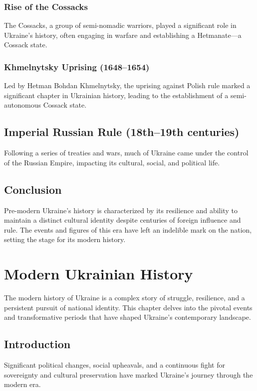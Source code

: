 \documentclass{book}
\begin{document}
\subsection{Rise of the Cossacks}
The Cossacks, a group of semi-nomadic warriors, played a significant role in Ukraine’s history, often engaging in warfare and establishing a Hetmanate—a Cossack state.

\subsection{Khmelnytsky Uprising (1648–1654)}
Led by Hetman Bohdan Khmelnytsky, the uprising against Polish rule marked a significant chapter in Ukrainian history, leading to the establishment of a semi-autonomous Cossack state.

\section{Imperial Russian Rule (18th–19th centuries)}
\label{sec:imperial-russian-rule}
Following a series of treaties and wars, much of Ukraine came under the control of the Russian Empire, impacting its cultural, social, and political life.

\section{Conclusion}
\label{sec:conclusion-pre-modern-ukraine}
Pre-modern Ukraine’s history is characterized by its resilience and ability to maintain a distinct cultural identity despite centuries of foreign influence and rule. The events and figures of this era have left an indelible mark on the nation, setting the stage for its modern history.

\chapter{Modern Ukrainian History}
\label{ch:modern-ukrainian-history}

The modern history of Ukraine is a complex story of struggle, resilience, and a persistent pursuit of national identity. This chapter delves into the pivotal events and transformative periods that have shaped Ukraine's contemporary landscape.

\section{Introduction}
\label{sec:introduction-modern-ukraine}
Significant political changes, social upheavals, and a continuous fight for sovereignty and cultural preservation have marked Ukraine's journey through the modern era.
\end{document}
